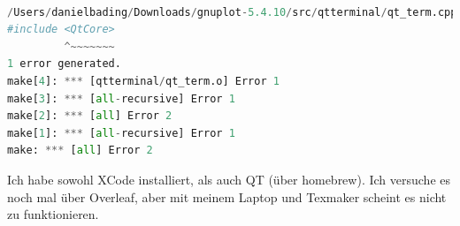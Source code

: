 \documentclass{scrartcl}
\begin{document}
\begin{lstlisting}[language=Python, label=pythoncode]

/Users/danielbading/Downloads/gnuplot-5.4.10/src/qtterminal/qt_term.cpp:51:10: fatal error: 'QtCore' file not found
#include <QtCore>
         ^~~~~~~~
1 error generated.
make[4]: *** [qtterminal/qt_term.o] Error 1
make[3]: *** [all-recursive] Error 1
make[2]: *** [all] Error 2
make[1]: *** [all-recursive] Error 1
make: *** [all] Error 2

\end{lstlisting}

Ich habe sowohl XCode installiert, als auch QT (über homebrew). Ich versuche es noch mal über Overleaf, aber mit meinem Laptop und Texmaker scheint es nicht zu funktionieren. 

\begin{figure}[H]


\end{figure}
\end{document}
